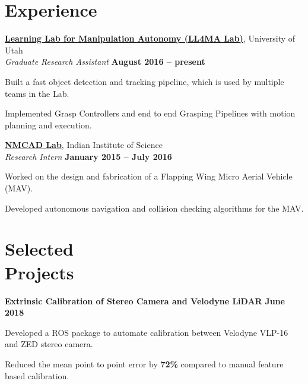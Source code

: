 \documentclass[letterpaper, margin, line, 10.5pt]{resume}
\begin{document}
\begin{resume}
    
    \sectionseperator
    \section{\myheadingstyle Experience}

    \href{https://robot-learning.cs.utah.edu}{\textbf{Learning Lab for Manipulation Autonomy (LL4MA Lab)}}, University of Utah \vspace{1pt}\\\vspace{1pt}%
    \textsl{Graduate Research Assistant} \hfill \textbf{August 2016 -- present}\\ \vspace{-4.5mm}
	\begin{list2}
		\item Built a fast object detection and tracking pipeline, which is used by multiple teams in the Lab.
		\item Implemented Grasp Controllers and end to end Grasping Pipelines with motion planning and execution.
	\end{list2}\vspace{-1.5mm}

    \href{http://www.aero.iisc.ernet.in/~dinesh/web/}{\textbf{NMCAD Lab}}, Indian Institute of Science \vspace{1pt}\\\vspace{1pt}%
    \textsl{Research Intern} \hfill \textbf{January 2015 -- July 2016}\\ \vspace{-4.5mm}
    \begin{list2}
    	\item Worked on the design and fabrication of a Flapping Wing Micro Aerial Vehicle (MAV).
    	\item Developed autonomous navigation and collision checking algorithms for the MAV.
    \end{list2}\vspace{-0.5mm}


    
	\sectionseperator
	\section{\myheadingstyle Selected \\ Projects}
	\textbf{Extrinsic Calibration of Stereo Camera and Velodyne LiDAR} \hfill \textbf{June 2018}
	\begin{list2}
		\item Developed a ROS package to automate calibration between Velodyne VLP-16 and ZED stereo camera.
		\item Reduced the mean point to point error by \textbf{72\%} compared to manual feature based calibration.
	\end{list2}\vspace{-3.2mm}
	

\end{resume}
\end{document}

